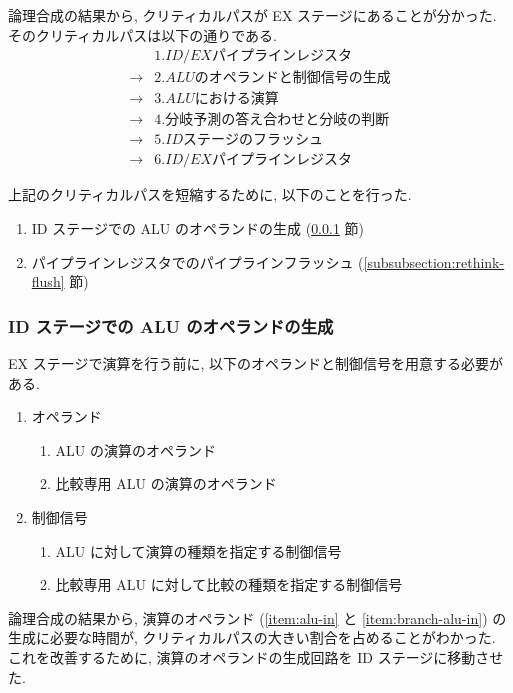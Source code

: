 \documentclass[../improvements.tex]{subfiles}
\begin{document}
  論理合成の結果から, クリティカルパスが EX ステージにあることが分かった.
  そのクリティカルパスは以下の通りである.
  \begin{displaymath}
    \begin{aligned}
      &1. ID/EX パイプラインレジスタ \\
      \rightarrow &2. ALU のオペランドと制御信号の生成 \\
      \rightarrow &3. ALU における演算 \\
      \rightarrow &4. 分岐予測の答え合わせと分岐の判断 \\
      \rightarrow &5. ID ステージのフラッシュ \\
      \rightarrow &6. ID/EX パイプラインレジスタ
    \end{aligned}
  \end{displaymath}

  上記のクリティカルパスを短縮するために, 以下のことを行った.
  \begin{enumerate}
    \item ID ステージでの ALU のオペランドの生成 (\ref{subsubsection:ex-to-id} 節)
    \item パイプラインレジスタでのパイプラインフラッシュ (\ref{subsubsection:rethink-flush} 節)
  \end{enumerate}

  \subsubsection{ID ステージでの ALU のオペランドの生成} \label{subsubsection:ex-to-id}
  EX ステージで演算を行う前に, 以下のオペランドと制御信号を用意する必要がある.
  \begin{enumerate}
    \item オペランド
      \begin{enumerate}
        \item ALU の演算のオペランド \label{item:alu-in}
        \item 比較専用 ALU の演算のオペランド \label{item:branch-alu-in}
      \end{enumerate}
    \item 制御信号
      \begin{enumerate}
        \item ALU に対して演算の種類を指定する制御信号 \label{item:alu-op}
        \item 比較専用 ALU に対して比較の種類を指定する制御信号 \label{item:branch-alu-op}
      \end{enumerate}
  \end{enumerate}
  論理合成の結果から, 演算のオペランド (\ref{item:alu-in} と \ref{item:branch-alu-in}) の生成に必要な時間が, 
  クリティカルパスの大きい割合を占めることがわかった.
  これを改善するために, 演算のオペランドの生成回路を ID ステージに移動させた.
\end{document}
